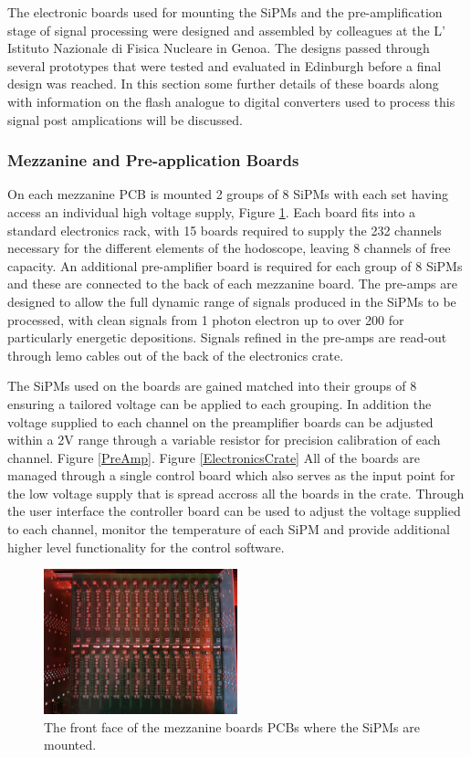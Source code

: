 The electronic boards used for mounting the SiPMs and the pre-amplification stage of signal processing were designed and assembled by colleagues at the L' Istituto Nazionale di Fisica Nucleare in Genoa. The designs passed through several prototypes that were tested and evaluated in Edinburgh before a final design was reached. In this section some further details of these boards along with information on the flash analogue to digital converters used to process this signal post amplications will be discussed.

\subsubsection*{Mezzanine and Pre-application Boards}

On each mezzanine PCB is mounted 2 groups of 8 SiPMs with each set having access an individual high voltage supply, Figure \ref{MezzPCB}. Each board fits into a standard electronics rack, with 15 boards required to supply the 232 channels necessary for the different elements of the hodoscope, leaving 8 channels of free capacity. An additional pre-amplifier board is required for each group of 8 SiPMs and these are connected to the back of each mezzanine board. The pre-amps are designed to allow the full dynamic range of signals produced in the SiPMs to be processed, with clean signals from 1 photon electron up to over 200 for particularly energetic depositions. Signals refined in the pre-amps are read-out through lemo cables out of the back of the electronics crate. 

The SiPMs used on the boards are gained matched into their groups of 8 ensuring a tailored voltage can be applied to each grouping. In addition the voltage supplied to each channel on the preamplifier boards can be adjusted within a 2V range through a variable resistor for precision calibration of each channel. Figure \ref{PreAmp}. Figure \ref{ElectronicsCrate} All of the boards are managed through a single control board which also serves as the input point for the low voltage supply that is spread accross all the boards in the crate. Through the user interface the controller board can be used to adjust the voltage supplied to each channel, monitor the temperature of each SiPM and provide additional higher level functionality for the control software.

\begin{figure}[!ht]
	\centering
	\includegraphics[width=0.5\textwidth]{ImgChap1/MezzBoards}
	\caption{The front face of the mezzanine boards PCBs where the SiPMs are mounted.}
	\label{MezzPCB}
\end{figure}


